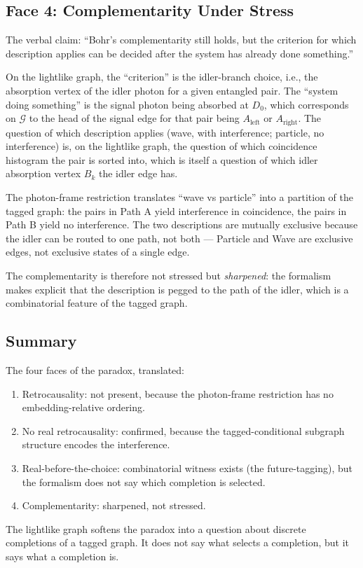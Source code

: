 \documentclass[11pt]{article}
\begin{document}
\subsection{Face 4: Complementarity Under Stress}

The verbal claim: ``Bohr's complementarity still holds, but the criterion for which description applies can be decided after the system has already done something.''

On the lightlike graph, the ``criterion'' is the idler-branch choice, i.e., the absorption vertex of the idler photon for a given entangled pair. The ``system doing something'' is the signal photon being absorbed at $D_0$, which corresponds on $\mathcal{G}$ to the head of the signal edge for that pair being $A_{\text{left}}$ or $A_{\text{right}}$. The question of which description applies (wave, with interference; particle, no interference) is, on the lightlike graph, the question of which coincidence histogram the pair is sorted into, which is itself a question of which idler absorption vertex $B_k$ the idler edge has.

The photon-frame restriction translates ``wave vs particle'' into a partition of the tagged graph: the pairs in Path A yield interference in coincidence, the pairs in Path B yield no interference. The two descriptions are mutually exclusive because the idler can be routed to one path, not both --- Particle and Wave are exclusive edges, not exclusive states of a single edge.

The complementarity is therefore not stressed but \emph{sharpened}: the formalism makes explicit that the description is pegged to the path of the idler, which is a combinatorial feature of the tagged graph.

\subsection{Summary}

The four faces of the paradox, translated:
\begin{enumerate}
    \item Retrocausality: not present, because the photon-frame restriction has no embedding-relative ordering.
    \item No real retrocausality: confirmed, because the tagged-conditional subgraph structure encodes the interference.
    \item Real-before-the-choice: combinatorial witness exists (the future-tagging), but the formalism does not say which completion is selected.
    \item Complementarity: sharpened, not stressed.
\end{enumerate}
The lightlike graph softens the paradox into a question about discrete completions of a tagged graph. It does not say what selects a completion, but it says what a completion is.
\end{document}
